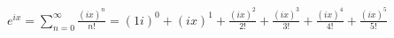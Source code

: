 \documentclass[preview]{standalone}
\begin{document}
\begin{align*}
e^{ix} = \sum_{n=0}^{\infty} \frac{(ix)^n}{n!} = (1i)^0 + (ix)^1 + \frac{(ix)^2}{2!} + \frac{(ix)^3}{3!} + \frac{(ix)^4}{4!} + \frac{(ix)^5}{5!} \\
\end{align*}
\end{document}
